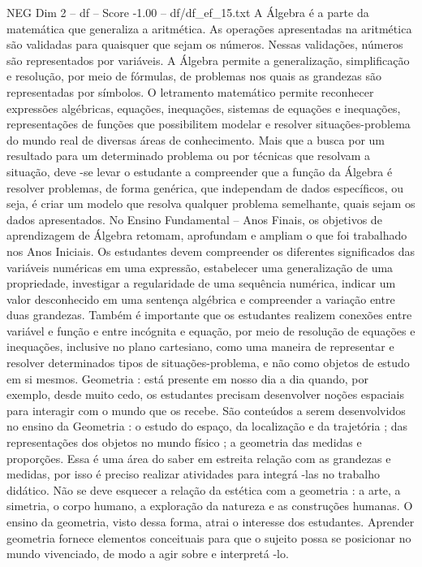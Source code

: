 \begin{textsample}{NEG Dim 2 – df – Score -1.00 – df/df\_ef\_15.txt}
A Álgebra é a parte da matemática que generaliza a aritmética.
As operações apresentadas na aritmética são validadas para quaisquer que sejam os números.
Nessas validações, números são representados por variáveis.
A Álgebra permite a generalização, simplificação e resolução, por meio de fórmulas, de problemas nos quais as grandezas são representadas por símbolos.
O letramento matemático permite reconhecer expressões algébricas, equações, inequações, sistemas de equações e inequações, representações de funções que possibilitem modelar e resolver situações-problema do mundo real de diversas áreas de conhecimento.
Mais que a busca por um resultado para um determinado problema ou por técnicas que resolvam a situação, deve -se levar o estudante a compreender que a função da Álgebra é resolver problemas, de forma genérica, que independam de dados específicos, ou seja, é criar um modelo que resolva qualquer problema semelhante, quais sejam os dados apresentados.
No Ensino Fundamental – Anos Finais, os objetivos de aprendizagem de Álgebra retomam, aprofundam e ampliam o que foi trabalhado nos Anos Iniciais.
Os estudantes devem compreender os diferentes significados das variáveis numéricas em uma expressão, estabelecer uma generalização de uma propriedade, investigar a regularidade de uma sequência numérica, indicar um valor desconhecido em uma sentença algébrica e compreender a variação entre duas grandezas.
Também é importante que os estudantes realizem conexões entre variável e função e entre incógnita e equação, por meio de resolução de equações e inequações, inclusive no plano cartesiano, como uma maneira de representar e resolver determinados tipos de situações-problema, e não como objetos de estudo em si mesmos.
Geometria : está presente em nosso dia a dia quando, por exemplo, desde muito cedo, os estudantes precisam desenvolver noções espaciais para interagir com o mundo que os recebe.
São conteúdos a serem desenvolvidos no ensino da Geometria : o estudo do espaço, da localização e da trajetória ; das representações dos objetos no mundo físico ; a geometria das medidas e proporções.
Essa é uma área do saber em estreita relação com as grandezas e medidas, por isso é preciso realizar atividades para integrá -las no trabalho didático.
Não se deve esquecer a relação da estética com a geometria : a arte, a simetria, o corpo humano, a exploração da natureza e as construções humanas.
O ensino da geometria, visto dessa forma, atrai o interesse dos estudantes.
Aprender geometria fornece elementos conceituais para que o sujeito possa se posicionar no mundo vivenciado, de modo a agir sobre e interpretá -lo.

\end{textsample}
